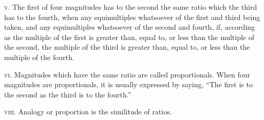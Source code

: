 \documentclass[oneside]{book}
\begin{document}

\textsc{v.} The first of four magnitudes has to the second
the same ratio which the third has to the fourth, when
any equimultiples whatsoever of the first and third
being taken, and any equimultiples whatsoever of the
second and fourth, if, according as the multiple of the
first is greater than, equal to, or less than the multiple
of the second, the multiple of the third is greater than,
equal to, or less than the multiple of the fourth.

\textsc{vi.} Magnitudes which have the same ratio are called
proportionals. When four magnitudes are proportionals,
it is usually expressed by saying, ``The first is to
the second as the third is to the fourth.''

\textsc{viii.} Analogy or proportion is the similitude of
ratios.\par\smallskip
\end{document}
